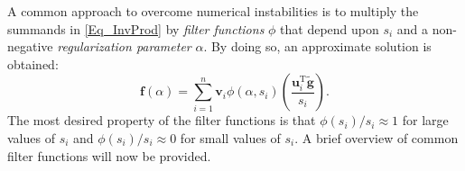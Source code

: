 \documentclass[12pt]{article}
\newcommand{\gnoise}{\widetilde{\mathbf{g}}}
\newcommand{\fdis}{\mathbf{f}}
\newcommand{\trans}{\mathrm{T}}	%
\newcommand{\regparam}{\alpha}
\newcommand{\filt}{\phi}
\newcommand{\singular}{s}	%
\newcommand{\LSV}{\mathbf{u}}	%
\newcommand{\RSV}{\mathbf{v}}	%
\begin{document}
A common approach to overcome numerical instabilities is to multiply the summands in \eqref{Eq_InvProd} by \textit{filter functions} $\filt$ that depend upon $\singular_i$ and a non-negative \textit{regularization parameter} $\regparam$. By doing so, an approximate solution is obtained:
\begin{equation}
\fdis(\regparam) = \sum_{i = 1}^n \RSV_i\filt(\regparam,\singular_i)\left(\frac{{\LSV^\trans_i}\gnoise}{\singular_i}\right).
\label{Eq_ApproxSol}
\end{equation}
The most desired property of the filter functions is that $\filt(\singular_i)/\singular_i \approx 1$  for large values of $\singular_i$ and $\filt(\singular_i)/\singular_i \approx 0$ for small values of $\singular_i$. A brief overview of common filter functions will now be provided. 
\end{document}

